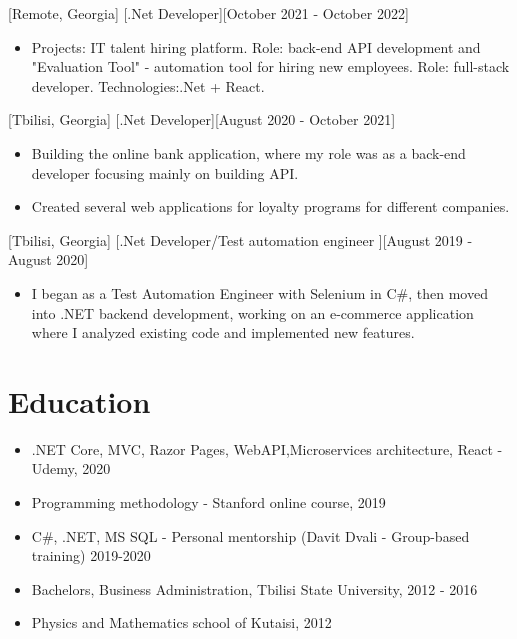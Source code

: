 \documentclass[11pt]{article}
\begin{document}
[Remote, Georgia]
[.Net Developer][October 2021 - October 2022]

\begin{itemize}
\item Projects: IT talent hiring platform. Role: back-end API development and "Evaluation Tool" - automation tool for hiring new employees. Role: full-stack developer. Technologies:.Net + React. 
\end{itemize}

[Tbilisi, Georgia]
[.Net Developer][August 2020 - October 2021]

\begin{itemize}
\item Building the online bank application, where my role was as a back-end developer focusing mainly on building API.
\end{itemize}
\begin{itemize}
\item Created several web applications for loyalty programs for different companies.
\end{itemize}



[Tbilisi, Georgia]
[.Net Developer/Test automation engineer ][August 2019 - August 2020]

\begin{itemize}
\item I began as a Test Automation Engineer with Selenium in C\#, then moved into .NET backend development, working on an e-commerce application where I analyzed existing code and implemented new features.
\end{itemize}

 
\section{Education}

\begin{itemize}
\item .NET Core, MVC, Razor Pages, WebAPI,Microservices architecture, React - Udemy, 2020
\item Programming methodology - Stanford online course, 2019
\item C\#, .NET, MS SQL - Personal mentorship (Davit Dvali - Group-based training) 2019-2020
\item Bachelors, Business Administration, Tbilisi State University, 2012 - 2016  
\item Physics and Mathematics school of Kutaisi, 2012
\end{itemize}
 
\end{document}
